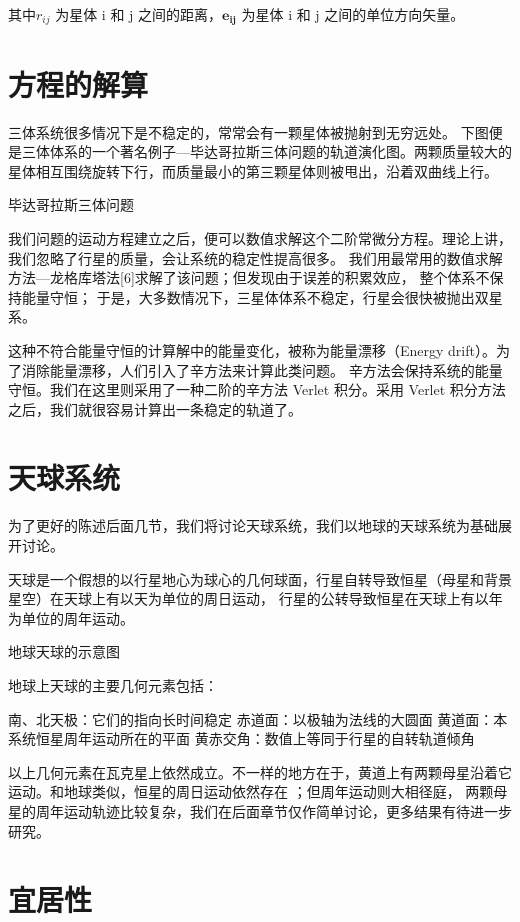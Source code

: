 \documentclass[a4paper,10.5pt]{book}
\begin{document}
其中$r_{ij}$ 为星体 i 和 j 之间的距离，$\mathbf{e_{ij}}$ 为星体 i 和 j 之间的单位方向矢量。

\section{方程的解算}

三体系统很多情况下是不稳定的，常常会有一颗星体被抛射到无穷远处。
下图便是三体体系的一个著名例子—毕达哥拉斯三体问题的轨道演化图。两颗质量较大的星体相互围绕旋转下行，而质量最小的第三颗星体则被甩出，沿着双曲线上行。

毕达哥拉斯三体问题

我们问题的运动方程建立之后，便可以数值求解这个二阶常微分方程。理论上讲，我们忽略了行星的质量，会让系统的稳定性提高很多。
我们用最常用的数值求解方法—龙格库塔法[6]求解了该问题；但发现由于误差的积累效应， 整个体系不保持能量守恒；
于是，大多数情况下，三星体体系不稳定，行星会很快被抛出双星系。

这种不符合能量守恒的计算解中的能量变化，被称为能量漂移（Energy drift）。为了消除能量漂移，人们引入了辛方法来计算此类问题。
辛方法会保持系统的能量守恒。我们在这里则采用了一种二阶的辛方法 Verlet 积分。采用 Verlet 积分方法之后，我们就很容易计算出一条稳定的轨道了。

\section{天球系统}

为了更好的陈述后面几节，我们将讨论天球系统，我们以地球的天球系统为基础展开讨论。

天球是一个假想的以行星地心为球心的几何球面，行星自转导致恒星（母星和背景星空）在天球上有以天为单位的周日运动，
行星的公转导致恒星在天球上有以年为单位的周年运动。

地球天球的示意图

地球上天球的主要几何元素包括：

南、北天极：它们的指向长时间稳定
赤道面：以极轴为法线的大圆面
黄道面：本系统恒星周年运动所在的平面
黄赤交角：数值上等同于行星的自转轨道倾角

以上几何元素在瓦克星上依然成立。不一样的地方在于，黄道上有两颗母星沿着它运动。和地球类似，恒星的周日运动依然存在 ；但周年运动则大相径庭，
两颗母星的周年运动轨迹比较复杂，我们在后面章节仅作简单讨论，更多结果有待进一步研究。

\section{宜居性}
\end{document}
